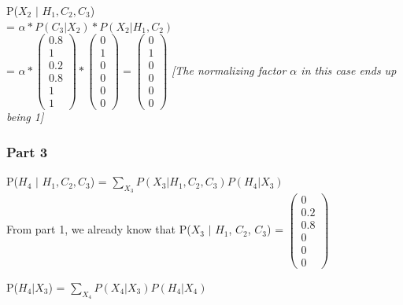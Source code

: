 \documentclass{article}
\begin{document}
\noindent 
P($X_2$ $\vert$ $H_1, C_2, C_3$) \\

\indent 
= $\alpha * P(C_3 \vert X_2) * P(X_2 \vert H_1, C_2)$ \\ 

\indent 
= $\alpha * 
\left(\begin{array}{c} 
        0.8 \\
        1 \\ 
        0.2 \\
        0.8 \\
        1 \\
        1
    \end{array}\right) * 
\left(\begin{array}{c} 
        0 \\
        1 \\ 
        0 \\
        0 \\
        0 \\
        0
    \end{array}\right) =
    \left(\begin{array}{c} 
        0 \\
        1 \\ 
        0 \\
        0 \\
        0 \\
        0
    \end{array}\right)$ 
\textit{[The normalizing factor $\alpha$ in this case ends up being 1]}

\subsubsection*{Part 3}
P($H_4$ $\vert$ $H_1, C_2, C_3$) = $\sum_{X_3} P(X_3 \vert H_1, C_2, C_3) P(H_4 \vert X_3)$\\ 

\noindent
From part 1, we already know that P($X_{3}$ $\vert$ $H_{1}$, $C_{2}$, $C_{3}$)
= $\left(\begin{array}{c} 
        0 \\
        0.2 \\ 
        0.8 \\
        0 \\
        0 \\
        0
    \end{array}\right)$ 

\noindent
P($H_4 \vert X_3$) = $\sum_{X_4} P(X_4 \vert X_3)P(H_4 \vert X_4)$ \\
\end{document}
